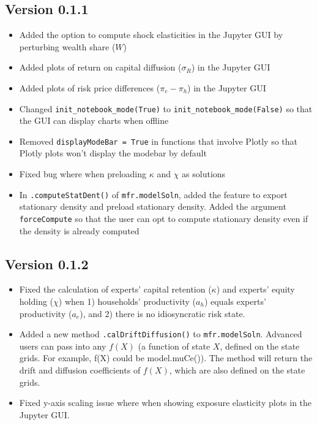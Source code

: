 \documentclass[12pt]{article}
\newcommand{\wealthSymbol}{$W$\xspace}
\begin{document}
\subsection{Version 0.1.1}
\begin{itemize}
\item Added the option to compute shock elasticities in the Jupyter GUI by perturbing wealth share (\wealthSymbol)
\item Added plots of return on capital diffusion ($\sigma_R$) in the Jupyter GUI
\item Added plots of risk price differences ($\pi_e - \pi_h$) in the Jupyter GUI
\item Changed \texttt{init\_notebook\_mode(True)} to \texttt{init\_notebook\_mode(False)} so that the GUI can display charts when offline
\item Removed \texttt{displayModeBar = True} in functions that involve Plotly so that Plotly plots won't display the modebar by default
\item Fixed bug where when preloading $\kappa$ and $\chi$ as solutions
\item In \texttt{.computeStatDent()} of \texttt{mfr.modelSoln}, added the feature to export stationary density and preload stationary density. Added the argument \texttt{forceCompute} so that the user can opt to compute stationary density even if the density is already computed
\end{itemize}
\subsection{Version 0.1.2}
\begin{itemize}
\item Fixed the calculation of experts' capital retention ($\kappa$) and experts' equity holding ($\chi$) when 1) households' productivity ($a_h$) equals experts' productivity ($a_e$), and 2) there is no idiosyncratic risk state.
\item Added a new method \texttt{.calDriftDiffusion()} to \texttt{mfr.modelSoln}. Advanced users can pass into any $f(X)$ (a function of state $X$, defined on the state grids. For example, f(X) could be model.muCe()). The method will return the drift and diffusion coefficients of $f(X)$, which are also defined on the state grids. 
\item Fixed y-axis scaling issue where when showing exposure elasticity plots in the Jupyter GUI.
\end{itemize}

\newpage


\end{document}
